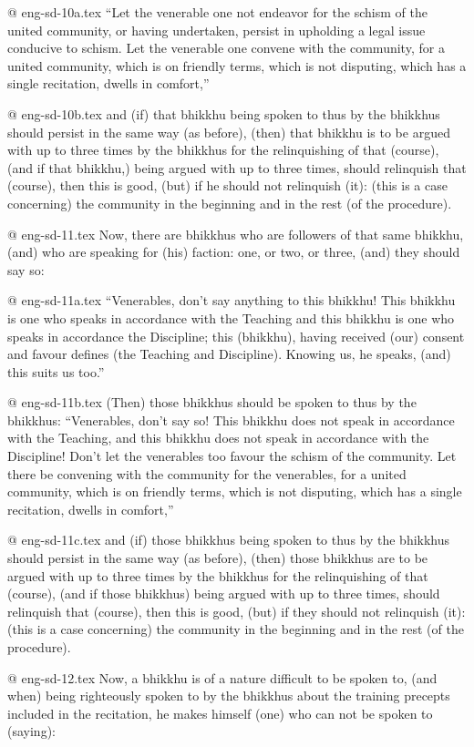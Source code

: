 @ eng-sd-10a.tex
“Let the venerable one not endeavor for the schism of the united community, or having undertaken, persist in upholding a legal issue conducive to schism. Let the venerable one convene with the community, for a united community, which is on friendly terms, which is not disputing, which has a single recitation, dwells in comfort,”

@ eng-sd-10b.tex
and (if) that bhikkhu being spoken to thus by the bhikkhus should persist in the same way (as before), (then) that bhikkhu is to be argued with up to three times by the bhikkhus for the relinquishing of that (course), (and if that bhikkhu,) being argued with up to three times, should relinquish that (course), then this is good, (but) if he should not relinquish (it): (this is a case concerning) the community in the beginning and in the rest (of the procedure).

@ eng-sd-11.tex
Now, there are bhikkhus who are followers of that same bhikkhu, (and) who are speaking for (his) faction: one, or two, or three, (and) they should say so:

@ eng-sd-11a.tex
“Venerables, don't say anything to this bhikkhu! This bhikkhu is one who speaks in accordance with the Teaching and this bhikkhu is one who speaks in accordance the Discipline; this (bhikkhu), having received (our) consent and favour defines (the Teaching and Discipline). Knowing us, he speaks, (and) this suits us too.”

@ eng-sd-11b.tex
(Then) those bhikkhus should be spoken to thus by the bhikkhus: “Venerables, don't say so! This bhikkhu does not speak in accordance with the Teaching, and this bhikkhu does not speak in accordance with the Discipline! Don't let the venerables too favour the schism of the community. Let there be convening with the community for the venerables, for a united community, which is on friendly terms, which is not disputing, which has a single recitation, dwells in comfort,”

@ eng-sd-11c.tex
and (if) those bhikkhus being spoken to thus by the bhikkhus should persist in the same way (as before), (then) those bhikkhus are to be argued with up to three times by the bhikkhus for the relinquishing of that (course), (and if those bhikkhus) being argued with up to three times, should relinquish that (course), then this is good, (but) if they should not relinquish (it): (this is a case concerning) the community in the beginning and in the rest (of the procedure).

@ eng-sd-12.tex
Now, a bhikkhu is of a nature difficult to be spoken to, (and when) being righteously spoken to by the bhikkhus about the training precepts included in the recitation, he makes himself (one) who can not be spoken to (saying):

